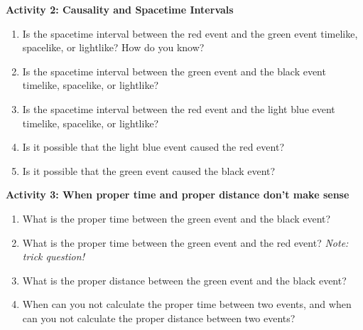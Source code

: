 \textbf{Activity 2: Causality and Spacetime Intervals}
\begin{enumerate}[labparts]
\item Is the spacetime interval between the red event and the green event timelike, spacelike, or lightlike?  How do you know?
\answerspace{0.6in}

\item Is the spacetime interval  between the green event and the black event timelike, spacelike, or lightlike? 
\answerspace{0.6in}

\item Is the spacetime interval  between the red event and the light blue event timelike, spacelike, or lightlike?
\answerspace{0.6in}

\item Is it possible that the light blue event caused the red event?
\answerspace{0.6in}

\item Is it possible that the green event caused the black event?
\answerspace{0.6in}
\end{enumerate}

\textbf{Activity 3: When proper time and proper distance don't make sense}
\begin{enumerate}[labparts]
\item What is the proper time between the green event and the black event?
\answerspace{0.6in}

\item What is the proper time between the green event and the red event?  \textit{Note: trick question!}
\answerspace{0.6in}

\item What is the proper distance between the green event and the black event?
\answerspace{0.6in}

\item When can you not calculate the proper time between two events, and when can you not calculate the proper distance between two events?
\answerspace{0.6in}
\end{enumerate}
